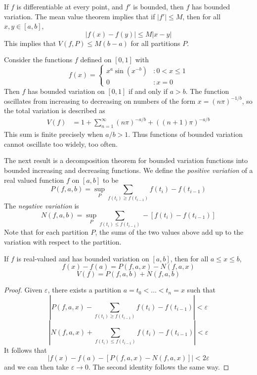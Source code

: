 \begin{example}
    If $f$ is differentiable at every point, and $f'$ is bounded, then $f$ has bounded variation. The mean value theorem implies that if $|f'| \leq M$, then for all $x,y \in [a,b]$,
    \[ |f(x) - f(y)| \leq M |x-y| \]
    This implies that $V(f,P) \leq M(b-a)$ for all partitions $P$.
\end{example}

\begin{example}
    Consider the functions $f$ defined on $[0,1]$ with
    \[ f(x) = \begin{cases} x^a \sin(x^{-b}) &: 0 < x \leq 1 \\ 0 &: x = 0 \end{cases} \]
    Then $f$ has bounded variation on $[0,1]$ if and only if $a > b$. The function oscillates from increasing to decreasing on numbers of the form $x = (n \pi)^{-1/b}$, so the total variation is described as
    \begin{align*}
      V(f) &= 1 + \sum_{n = 1}^\infty (n \pi)^{-a/b} + ((n+1) \pi)^{-a/b}
    \end{align*}
    This sum is finite precisely when $a/b > 1$. Thus functions of bounded variation cannot oscillate too widely, too often.
\end{example}

The next result is a decomposition theorem for bounded variation functions into bounded increasing and decreasing functions. We define the \emph{positive variation} of a real valued function $f$ on $[a,b]$ to be
%
\[ P(f,a,b) = \sup_P \sum_{f(t_i) \geq f(t_{i-1})} f(t_i) - f(t_{i-1}) \]
%
The \emph{negative variation} is
%
\[ N(f,a,b) = \sup_P \sum_{f(t_i) \leq f(t_{i-1})} -[f(t_i) - f(t_{i-1})] \]
%
Note that for each partition $P$, the sums of the two values above add up to the variation with respect to the partition.

\begin{lemma}
    If $f$ is real-valued and has bounded variation on $[a,b]$, then for all $a \leq x \leq b$,
    \[ f(x) - f(a) = P(f,a,x) - N(f,a,x) \]
    \[ V(f) = P(f,a,b) + N(f,a,b) \]
\end{lemma}
\begin{proof}
    Given $\varepsilon$, there exists a partition $a = t_0 < \dots < t_n = x$ such that
    \[ \left| P(f,a,x) - \sum_{f(t_i) \geq f(t_{i-1})} f(t_i) - f(t_{i-1}) \right| < \varepsilon \]
    \[ \left| N(f,a,x) + \sum_{f(t_i) \leq f(t_{i-1})} f(t_i) - f(t_{i-1}) \right| < \varepsilon \]
    It follows that
    \[ |f(x) - f(a) - [P(f,a,x) - N(f,a,x)]| < 2 \varepsilon \]
    and we can then take $\varepsilon \to 0$. The second identity follows the same way.
\end{proof}

